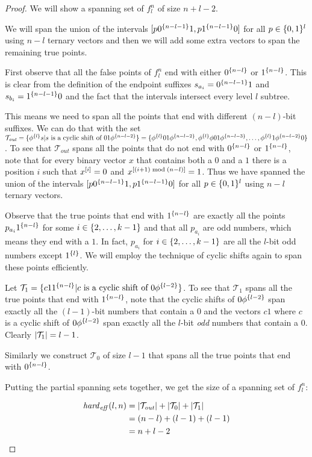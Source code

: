 \begin{proof}
We will show a spanning set of $f_l^n$ of size $n+l-2$.

We will span the union of the intervals
$[p 0^{\{n-l-1\}} 1, p 1^{\{n-l-1\}} 0]$
for all $p \in \{0, 1\}^l$
using $n-l$ ternary vectors
and then we will add some extra vectors
to span the remaining true points.

First observe that all the false points of $f_l^n$
end with either $0^{\{n-l\}}$ or $1^{\{n-l\}}$.
This is clear from the definition
of the  endpoint suffixes
$s_{a_i} = 0^{\{n-l-1\}} 1$
and $s_{b_i} = 1^{\{n-l-1\}} 0$
and the fact that the intervals intersect every
level $l$ subtree.

This means we need to span all the points that end
with different $(n-l)$-bit suffixes.
We can do that with the set
$\mathcal{T}_{\mathit{out}}
= \{\phi^{\{l\}} s
| s \text{ is a cyclic shift of } 01 \phi^{\{n-l-2\}}\}
= \{
\phi^{\{l\}} 01 \phi^{\{n-l-2\}},
\phi^{\{l\}} \phi 01 \phi^{\{n-l-3\}},
\ldots,
\phi^{\{l\}} 1 \phi^{\{n-l-2\}} 0
\}
$.
To see that $\mathcal{T}_{\mathit{out}}$
spans all the points
that do not end with $0^{\{n-l\}}$ or $1^{\{n-l\}}$,
note that for every binary vector $x$
that contains both a $0$ and a $1$
there is a position $i$
such that $x^{[i]} = 0$
and $x^{[(i+1) \bmod (n-l)]} = 1$.
Thus we have spanned the union of the intervals
$[p 0^{\{n-l-1\}} 1, p 1^{\{n-l-1\}} 0]$
for all $p \in \{0, 1\}^l$
using $n-l$ ternary vectors.

Observe that
the true points
that end with $1^{\{n-l\}}$
are exactly all the points $p_{a_i} 1^{\{n-l\}}$
for some $i \in \{2, \ldots, k-1\}$
and that all $p_{a_i}$ are odd numbers,
which means they end with a $1$.
In fact,
$p_{a_i}$ for $i \in \{2, \ldots, k-1\}$
are all the $l$-bit odd numbers except $1^{\{l\}}$.
We will employ the technique of cyclic shifts
again
to span these points efficiently.

Let $\mathcal{T}_1 = \{c 1 1^{\{n-l\}}
| c \text{ is a cyclic shift of } 0 \phi^{\{l-2\}}\}$.
To see that $\mathcal{T}_1$ spans all the true points
that end with $1^{\{n-l\}}$,
note that the cyclic shifts of $0 \phi^{\{l-2\}}$
span exactly all the $(l-1)$-bit numbers that contain a $0$
and the vectors $c 1$
where $c$ is a cyclic shift of $0 \phi^{\{l-2\}}$
span exactly all the $l$-bit \emph{odd} numbers
that contain a $0$.
Clearly $\lvert\mathcal{T}_1\rvert = l-1$.

Similarly we construct $\mathcal{T}_0$ of size $l-1$
that spans all the true points
that end with $0^{\{n-l\}}$.

Putting the partial spanning sets together,
we get the size of a spanning set of $f_l^n$:

\begin{align*}
\mathit{hard}_{\mathit{eff}}(l,n)
&= \lvert\mathcal{T}_{\mathit{out}}\rvert
+ \lvert\mathcal{T}_0\rvert + \lvert\mathcal{T}_1\rvert \\
&= (n-l) + (l-1) + (l-1) \\
&= n + l - 2
\end{align*}
\end{proof}

